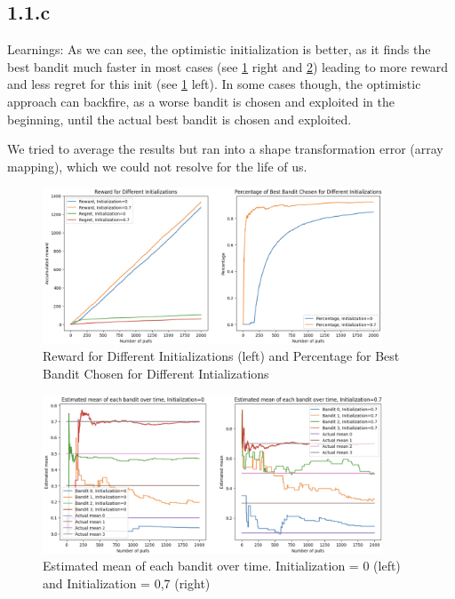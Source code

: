 \documentclass{article} %
\begin{document}
	\newpage
	
	\subsection{1.1.c}
	
	Learnings: As we can see, the optimistic initialization is better, as it finds the best bandit much faster in most cases (see \ref{fig:1.1.c.1} right and \ref{fig:1.1.c.2}) leading to more reward and less regret for this init (see \ref{fig:1.1.c.1} left). In some cases though, the optimistic approach can backfire, as a worse bandit is chosen and exploited in the beginning, until the actual best bandit is chosen and exploited.
	
	We tried to average the results but ran into a shape transformation error (array mapping), which we could not resolve for the life of us. 
	\newline
	\begin{figure}[h!]
		\centering
		\includegraphics[width=0.9\textwidth]{images/1.1.c.1}
		\caption{Reward for Different Initializations (left) and Percentage for Best Bandit Chosen for Different Intializations}
		\label{fig:1.1.c.1}
	\end{figure}
	\begin{figure}[h!]
		\centering
		\includegraphics[width=0.9\textwidth]{images/1.1.c.2}
		\caption{Estimated mean of each bandit over time. Initialization = 0 (left) and Initialization = 0,7 (right)}
		\label{fig:1.1.c.2}
		
	\end{figure}
	\newpage
	
\end{document}
